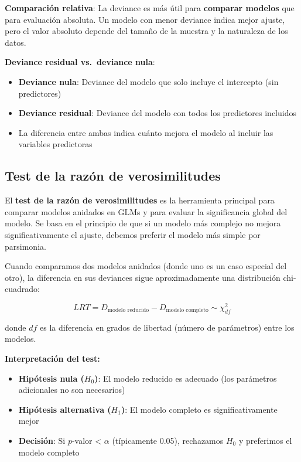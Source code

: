 \documentclass[
  letterpaper,
  DIV=11,
  numbers=noendperiod]{scrreprt}
\providecommand{\tightlist}{%
  \setlength{\itemsep}{0pt}\setlength{\parskip}{0pt}}
\begin{document}
\textbf{Comparación relativa}: La deviance es más útil para
\textbf{comparar modelos} que para evaluación absoluta. Un modelo con
menor deviance indica mejor ajuste, pero el valor absoluto depende del
tamaño de la muestra y la naturaleza de los datos.

\textbf{Deviance residual vs.~deviance nula}:

\begin{itemize}
\tightlist
\item
  \textbf{Deviance nula}: Deviance del modelo que solo incluye el
  intercepto (sin predictores)
\item
  \textbf{Deviance residual}: Deviance del modelo con todos los
  predictores incluidos
\item
  La diferencia entre ambas indica cuánto mejora el modelo al incluir
  las variables predictoras
\end{itemize}

\subsection{Test de la razón de
verosimilitudes}\label{test-de-la-razuxf3n-de-verosimilitudes}

El \textbf{test de la razón de verosimilitudes} es la herramienta
principal para comparar modelos anidados en GLMs y para evaluar la
significancia global del modelo. Se basa en el principio de que si un
modelo más complejo no mejora significativamente el ajuste, debemos
preferir el modelo más simple por parsimonia.

Cuando comparamos dos modelos anidados (donde uno es un caso especial
del otro), la diferencia en sus deviances sigue aproximadamente una
distribución chi-cuadrado:

\[
LRT = D_{\text{modelo reducido}} - D_{\text{modelo completo}} \sim \chi^2_{df}
\]

donde \(df\) es la diferencia en grados de libertad (número de
parámetros) entre los modelos.

\textbf{Interpretación del test:}

\begin{itemize}
\tightlist
\item
  \textbf{Hipótesis nula (\(H_0\))}: El modelo reducido es adecuado (los
  parámetros adicionales no son necesarios)
\item
  \textbf{Hipótesis alternativa (\(H_1\))}: El modelo completo es
  significativamente mejor
\item
  \textbf{Decisión}: Si \(p\)-valor \textless{} \(\alpha\) (típicamente
  0.05), rechazamos \(H_0\) y preferimos el modelo completo
\end{itemize}
\end{document}

